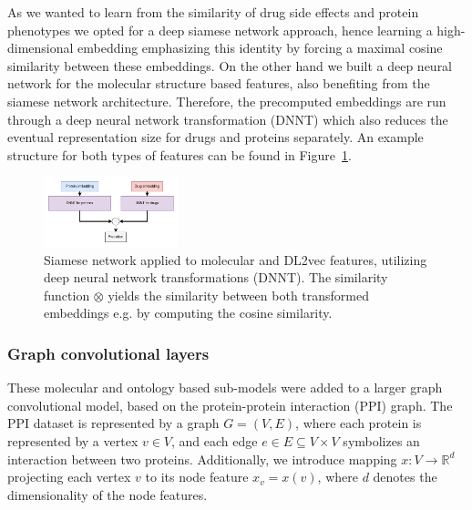 \documentclass{bioinfo}
\begin{document}
As we wanted to learn from the similarity of drug side effects and
protein phenotypes we opted for a deep siamese network approach, hence
learning a high-dimensional embedding emphasizing this identity by
forcing a maximal cosine similarity between these embeddings. On the
other hand we built a deep neural network for the molecular structure
based features, also benefiting from the siamese network
architecture. Therefore, the precomputed embeddings are run through a
deep neural network transformation (DNNT) which also reduces the
eventual representation size for drugs and proteins separately. An
example structure for both types of features can be found in
Figure~\ref{fig:SiameseNetwork}.

\begin{figure}[!tpb]%
	\centerline{\includegraphics[width=0.35\textwidth]{figures/siamese_network.png}}
	\caption{Siamese network applied to molecular and DL2vec
          features, utilizing deep neural network transformations
          (DNNT). The similarity function $\otimes$ yields the
          similarity between both transformed embeddings e.g. by
          computing the cosine similarity.}
	\label{fig:SiameseNetwork}
\end{figure}


\subsubsection{Graph convolutional layers}
These molecular and ontology based sub-models were added to a larger
graph convolutional model, based on the protein-protein interaction
(PPI) graph. The PPI dataset is represented by a graph $G=(V,E)$,
where each protein is represented by a vertex $v\in V$, and each edge
$e\in E\subseteq V\times V$ symbolizes an interaction between two
proteins. Additionally, we introduce mapping
$x:V\rightarrow\mathbb{R}^{d}$ projecting each vertex $v$ to its node
feature $x_v = x(v)$, where $d$ denotes the dimensionality of the node
features.
 
\end{document}
